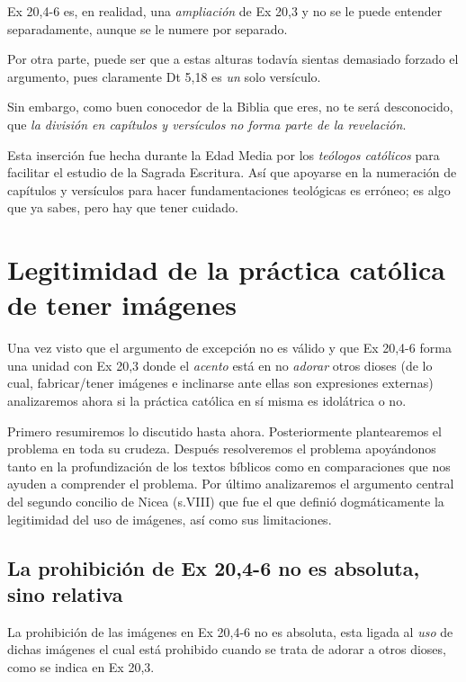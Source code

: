 \documentclass{article}
\begin{document}
Ex 20,4-6 es, en realidad, una \emph{ampliaci\'on} de Ex 20,3 y no se le puede entender separadamente, aunque se le numere por separado.

Por otra parte, puede ser que a estas alturas todav\'{i}a sientas demasiado forzado el argumento, pues claramente Dt 5,18 es \emph{un} solo vers\'{i}culo.

Sin embargo, como buen conocedor de la Biblia que eres, no te ser\'a desconocido, que \emph{la divisi\'on en cap\'{i}tulos y vers\'{i}culos no forma parte de la revelaci\'on}.

Esta inserci\'on fue hecha durante la Edad Media por los \emph{te\'ologos cat\'olicos} para facilitar el estudio de la Sagrada Escritura. As\'{i} que apoyarse en la numeraci\'on de cap\'{i}tulos y vers\'{i}culos para hacer fundamentaciones teol\'ogicas es err\'oneo; es algo que ya sabes, pero hay que tener cuidado.

\section{Legitimidad de la pr\'actica cat\'olica de tener im\'agenes}

Una vez visto que el argumento de excepci\'on no es v\'alido y que Ex 20,4-6 forma una unidad con Ex 20,3 donde el \emph{acento} est\'a en no \emph{adorar} otros dioses (de lo cual, fabricar/tener im\'agenes e inclinarse ante ellas son expresiones externas) analizaremos ahora si la pr\'actica cat\'olica en s\'{i} misma es idol\'atrica o no.

Primero resumiremos lo discutido hasta ahora. Posteriormente plantearemos el problema en toda su crudeza. Despu\'es resolveremos el problema apoy\'andonos tanto en la profundizaci\'on de los textos b\'{i}blicos como en comparaciones que nos ayuden a comprender el problema. Por \'ultimo analizaremos el argumento central del segundo concilio de Nicea (s.VIII) que fue el que defini\'o dogm\'aticamente la legitimidad del uso de im\'agenes, as\'{i} como sus limitaciones.

\subsection{La prohibici\'on de Ex 20,4-6 no es absoluta, sino relativa}

La prohibici\'on de las im\'agenes en Ex 20,4-6 no es absoluta, esta ligada al \emph{uso} de dichas im\'agenes el cual est\'a prohibido cuando se trata de adorar a otros dioses, como se indica en Ex 20,3.
\end{document}
